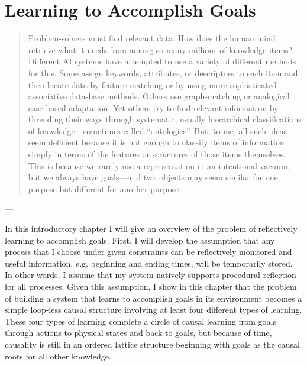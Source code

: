 \chapter{Learning to Accomplish Goals}\label{ch:learning_to_accomplish_goals}

\begin{quote}
  Problem-solvers must find relevant data.  How does the human mind
  retrieve what it needs from among so many millions of knowledge items?
  Different AI systems have attempted to use a variety of different
  methods for this.  Some assign keywords, attributes, or descriptors to
  each item and then locate data by feature-matching or by using more
  sophisticated associative data-base methods.  Others use
  graph-matching or analogical case-based adaptation.  Yet others try to
  find relevant information by threading their ways through systematic,
  usually hierarchical classifications of knowledge---sometimes called
  ``ontologies''.  But, to me, all such ideas seem deficient because it
  is not enough to classify items of information simply in terms of the
  features or structures of those items themselves.  This is because we
  rarely use a representation in an intentional vacuum, but we always
  have goals---and two objects may seem similar for one purpose but
  different for another purpose.
\end{quote}
\begin{flushright}
  --- 
\end{flushright}

%
%

In this introductory chapter I will give an overview of the problem of
reflectively learning to accomplish goals.  First, I will develop the
assumption that any process that I choose under given constraints can
be reflectively monitored and useful information, e.g. beginning and
ending times, will be temporarily stored.  In other words, I assume
that my system natively supports procedural reflection for all
processes.  Given this assumption, I show in this chapter that the
problem of building a system that learns to accomplish goals in its
environment becomes a simple loop-less causal structure involving at
least four different types of learning.  These four types of learning
complete a circle of causal learning from goals through actions to
physical states and back to goals, but because of time, causality is
still in an ordered lattice structure beginning with goals as the
causal roots for all other knowledge.

